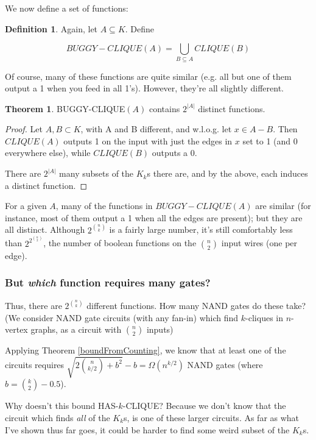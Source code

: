\documentclass[12pt]{article}
\theoremstyle{definition}
\newtheorem{thm}{Theorem}[section]
\newtheorem{defn}{Definition}[section]
\begin{document}
We now define a set of functions:

\begin{defn}
\label{BUGGY-CLIQUE}
Again, let $A \subseteq K$. Define

\[
BUGGY-CLIQUE(A) = \bigcup_{B \subseteq A} CLIQUE(B)
\]
\end{defn}



Of course, many of these functions are quite similar (e.g. all but one of them
output a 1 when you feed in all 1's). However, they're all slightly different.

\begin{thm}
\label{buggyDistinct}
BUGGY-CLIQUE$(A)$ contains $2^{|A|}$ distinct functions.
\end{thm}
\begin{proof}

Let $A,B \subset K$, with A and B different, and w.l.o.g.
let $x \in A-B$. Then $CLIQUE(A)$ outputs 1 on the input
with just the edges in $x$ set to 1 (and 0 everywhere else),
while $CLIQUE(B)$ outputs a 0.

There are $2^{|A|}$ many subsets of the $K_k$s there are,
and by the above, each induces a distinct function.
\end{proof}

For a given $A$, many of the functions in $BUGGY-CLIQUE(A)$
are similar (for instance, most
of them output a 1 when all the edges are present);
but they are all distinct.
Although $2^{n \choose k}$ is a fairly large number,
it's still comfortably less than $2^{2^{n \choose 2}}$, the number of boolean
functions on the ${n \choose 2}$ input wires (one per edge).

\subsubsection{But {\em which} function requires many gates?}

Thus, there are $2^{n \choose k}$ different functions. 
How many NAND gates do these take?
(We consider NAND gate circuits (with any fan-in) which find $k$-cliques in $n$-vertex
graphs, as a circuit with $n \choose 2$ inputs)

Applying Theorem
\ref{boundFromCounting}, we know that at least one of the circuits requires
${\sqrt {2 {n \choose {k/2}} + b^2}} - b = \Omega(n^{k/2})$ 
NAND gates (where $b = {k \choose 2} - 0.5$).

Why doesn't this bound HAS-$k$-CLIQUE?
Because we don't know that the circuit which finds {\em all} of the
$K_k$s, is one of these larger circuits. As far as what I've
shown thus far goes, it could be harder to find some weird subset of the $K_k$s.
\end{document}
